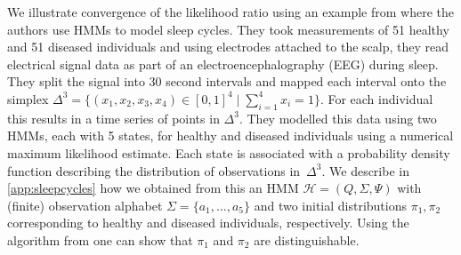 \documentclass[a4paper,UKenglish,cleveref, autoref,mathscr]{lipics-v2019}
\newcommand{\1}{\mathbbm{1}}
\renewcommand{\H}{\mathcal{H}}
\begin{document}
\begin{example}\label{sleepcycles}
We illustrate convergence of the likelihood ratio using an example from \cite{rockhart13} where the authors use HMMs to model sleep cycles.
They took measurements of 51 healthy and 51 diseased individuals and using electrodes attached to the scalp, they read electrical signal data as part of an electroencephalography (EEG) during sleep.
They split the signal into 30 second intervals and mapped each interval onto the simplex $\Delta^3 = \{(x_1, x_2, x_3, x_4) \in [0,1]^4 \mid \sum_{i = 1}^4 x_i = 1\}$.
For each individual this results in a time series of points in $\Delta^3$.
They modelled this data using two HMMs, each with 5 states, for healthy and diseased individuals using a numerical maximum likelihood estimate.
Each state is associated with a probability density function describing the distribution of observations in~$\Delta^3$.
We describe in \cref{app:sleepcycles} how we obtained from this an HMM $\H = (Q, \Sigma, \Psi)$ with (finite) observation alphabet $\Sigma = \{a_1, \ldots, a_5\}$ and two initial distributions $\pi_1, \pi_2$ corresponding to healthy and diseased individuals, respectively.
Using the algorithm from \cite{kief14} one can show that $\pi_1$ and $\pi_2$ are distinguishable.


\end{example}
\end{document}
